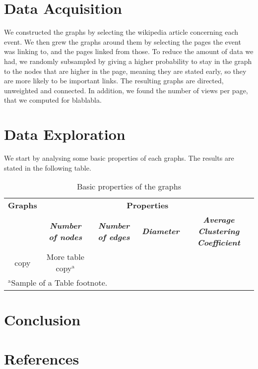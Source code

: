 \documentclass[conference]{IEEEtran}
\begin{document}
\section{Data Acquisition}

We constructed the graphs by selecting the wikipedia article concerning each event. We then grew the graphs around them by selecting the pages the event was linking to, and the pages linked from those. To reduce the amount of data we had, we randomly subsampled by giving a higher probability to stay in the graph to the nodes that are higher in the page, meaning they are stated early, so they are more likely to be important links. The resulting graphs are directed, unweighted and connected. In addition, we found the number of views per page, that we computed for blablabla. 



\section{Data Exploration}

We start by analysing some basic properties of each graphs. The results are stated in the  following table. 

\begin{table}[htbp]
\caption{Basic properties of the graphs}
\begin{center}
\begin{tabular}{|c|c|c|c|c|}
\hline
\textbf{Graphs}&\multicolumn{4}{|c|}{\textbf{Properties}} \\
\cline{2-5} 
\textbf{ } & \textbf{\textit{Number of nodes}}& \textbf{\textit{Number of edges}}& \textbf{\textit{Diameter}} & \textbf{\textit{Average Clustering Coefficient}}\\
\hline
copy& More table copy$^{\mathrm{a}}$& &  \\
\hline
\multicolumn{4}{l}{$^{\mathrm{a}}$Sample of a Table footnote.}
\end{tabular}
\label{tab1}
\end{center}
\end{table}



\section{Conclusion}

\section*{References}


\cite{laplacian}  
\cite{signalprocessing}
\cite{clustering}



\end{document}

